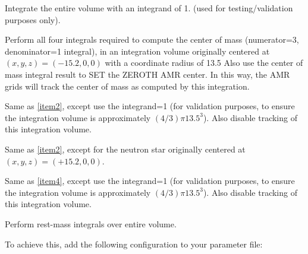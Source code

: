 \begin{packed_enumerate}
  \item Integrate the entire volume with an integrand of 1.
  (used for testing/validation purposes only).
  \label{item1}

  \item Perform all four integrals required to compute the
  center of mass (numerator=3, denominator=1 integral),
  in an integration volume originally centered at
  $(x,y,z)=(-15.2,0,0)$ with a coordinate radius of 13.5
  Also use the center of mass integral result to SET
  the ZEROTH AMR center. In this way, the AMR grids
  will track the center of mass as computed by this
  integration.
  \label{item2}

  \item Same as \ref{item2}, except use the integrand=1 (for validation
  purposes, to ensure the integration volume is
  approximately $(4/3)\pi13.5^3$). Also disable tracking of
  this integration volume.
  \label{item3}

  \item Same as \ref{item2}, except for the neutron star originally
  centered at $(x,y,z)=(+15.2,0,0)$.
  \label{item4}

  \item Same as \ref{item4}, except use the integrand=1 (for validation
  purposes, to ensure the integration volume is
  approximately $(4/3)\pi13.5^3$). Also disable tracking of
  this integration volume.
  \label{item5}

  \item Perform rest-mass integrals over entire volume.
  \label{item6}
\end{packed_enumerate}
To achieve this, add the following configuration to your parameter file:
